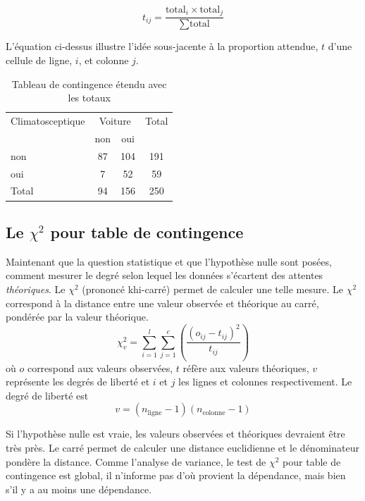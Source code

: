 \documentclass[
]{book}
\begin{document}
\[t_{ij} = \frac{\text{total}_i \times \text{total}_j}{\sum \text{total}}\]

L'équation ci-dessus illustre l'idée sous-jacente à la proportion attendue, \(t\) d'une cellule de ligne, \(i\), et colonne \(j\).

\begin{table}[H]

\caption{\label{tab:TCCV2}Tableau de contingence étendu avec les totaux}
\centering
\begin{tabular}[t]{lccc}
\toprule
\multicolumn{1}{c}{Climatosceptique} & \multicolumn{2}{c}{Voiture} & \multicolumn{1}{c}{Total} \\
\cmidrule(l{3pt}r{3pt}){1-1} \cmidrule(l{3pt}r{3pt}){2-3} \cmidrule(l{3pt}r{3pt}){4-4}
  & non & oui & \\
\midrule
non & 87 & 104 & 191\\
oui & 7 & 52 & 59\\
Total & 94 & 156 & 250\\
\bottomrule
\end{tabular}
\end{table}

\hypertarget{le-chi2-pour-table-de-contingence}{%
\subsection{\texorpdfstring{Le \(\chi^2\) pour table de contingence}{Le \textbackslash chi\^{}2 pour table de contingence}}\label{le-chi2-pour-table-de-contingence}}

Maintenant que la question statistique et que l'hypothèse nulle sont posées, comment mesurer le degré selon lequel les données s'écartent des attentes \emph{théoriques}. Le \(\chi^2\) (prononcé khi-carré) permet de calculer une telle mesure. Le \(\chi^2\) correspond à la distance entre une valeur observée et théorique au carré, pondérée par la valeur théorique.
\[ \chi^2_v = \sum_{i=1}^{l}\sum_{j=1}^c(\frac{(o_{ij}-t_{ij})^2}{t_{ij}})\]
où \(o\) correspond aux valeurs observées, \(t\) réfère aux valeurs théoriques, \(v\) représente les degrés de liberté et \(i\) et \(j\) les lignes et colonnes respectivement. Le degré de liberté est
\[v = (n_{\text{ligne}}-1)(n_{\text{colonne}}-1)\]

Si l'hypothèse nulle est vraie, les valeurs observées et théoriques devraient être très près. Le carré permet de calculer une distance euclidienne et le dénominateur pondère la distance. Comme l'analyse de variance, le test de \(\chi^2\) pour table de contingence est global, il n'informe pas d'où provient la dépendance, mais bien s'il y a au moins une dépendance.
\end{document}
